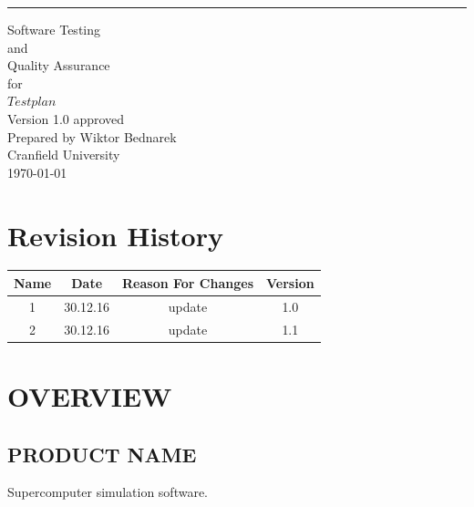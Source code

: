 \documentclass{scrreprt}
\date{}
\def\myversion{1.0 }
\begin{document}
\begin{flushright}
    \rule{16cm}{5pt}\vskip1cm
    \begin{bfseries}
        \Huge{Software Testing \\and\\ Quality Assurance} \\
        \vspace{1.9cm}
        for\\
        \vspace{1.9cm}
        $Test plan$\\
        \vspace{1.9cm}
        \LARGE{Version \myversion approved}\\
        \vspace{1.9cm}
        Prepared by Wiktor Bednarek\\
        \vspace{1.9cm}
        Cranfield University\\
        \vspace{1.9cm}
        \today\\
    \end{bfseries}
\end{flushright}

\tableofcontents


\chapter*{Revision History}

\begin{center}
    \begin{tabular}{|c|c|c|c|}
        \hline
	    Name & Date & Reason For Changes & Version\\
        \hline
	    1 & 30.12.16 & update & 1.0\\
        \hline
	    2 & 30.12.16 & update & 1.1\\
        \hline
    \end{tabular}
\end{center}
\FloatBarrier
\chapter{OVERVIEW}

\section{PRODUCT NAME}


Supercomputer simulation software.
\end{document}

